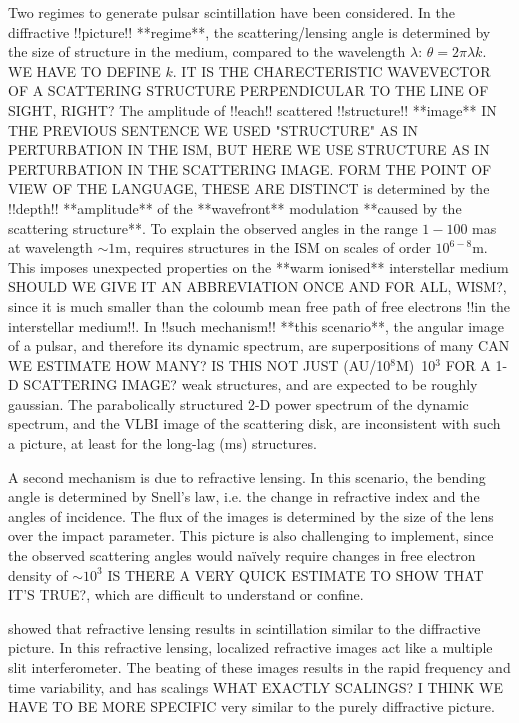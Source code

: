 \documentclass[useAMS,usenatbib]{mn2e}
\begin{document}
Two regimes to generate pulsar scintillation have been considered. In
the diffractive !!picture!! **regime**, the scattering/lensing angle is determined by
the size of structure in the medium, compared to the wavelength
$\lambda$: $\theta=2\pi\lambda k$. WE HAVE TO DEFINE $k$. IT IS THE CHARECTERISTIC WAVEVECTOR 
OF A SCATTERING STRUCTURE PERPENDICULAR TO THE LINE OF SIGHT, RIGHT?  The amplitude of !!each!! scattered
!!structure!! **image** IN THE PREVIOUS SENTENCE WE USED "STRUCTURE" AS IN PERTURBATION IN THE ISM,
BUT HERE WE USE STRUCTURE AS IN PERTURBATION IN THE SCATTERING IMAGE. FORM THE POINT OF VIEW
OF THE LANGUAGE, THESE ARE DISTINCT is determined by the !!depth!! **amplitude** of the **wavefront** modulation **caused by the scattering structure**.  To explain
the observed angles in the range $1-100$ mas at wavelength $\sim 1$m,
requires structures in the ISM on scales of order $10^{6-8}$m. This
imposes unexpected properties on the **warm ionised** interstellar medium SHOULD WE GIVE IT
AN ABBREVIATION ONCE AND FOR ALL, WISM?, since it is
much smaller than the coloumb mean free path of free electrons !!in the
interstellar medium!!.  In !!such mechanism!! **this scenario**, the angular image of a
pulsar, and therefore its dynamic spectrum, are superpositions of many CAN WE ESTIMATE HOW MANY?
IS THIS NOT JUST (AU/10$^8$M)~10$^3$ FOR A 1-D SCATTERING IMAGE?
weak structures, and are expected to be roughly gaussian.  The
parabolically structured 2-D power spectrum of the dynamic spectrum,
and the VLBI image of the scattering disk, are inconsistent with such
a picture, at least for the long-lag (ms) structures.

A second mechanism is due to refractive lensing.  In this scenario,
the bending angle is determined by Snell's law, i.e. the change in
refractive index and the angles of incidence.  The flux of the images
is determined by the size of the lens over the impact parameter.  This
picture is also challenging to implement, since the observed
scattering angles would na\"ively require changes in free electron
density of $\sim 10^3$ IS THERE A VERY QUICK ESTIMATE TO
SHOW THAT IT'S TRUE?, which are difficult to understand or confine.

\cite{2006ApJ...640L.159G} showed that refractive lensing results in
scintillation similar to the diffractive picture.  In this refractive
lensing, localized refractive images act like a multiple slit
interferometer. The beating of these images results in the rapid
frequency and time variability, and has scalings WHAT EXACTLY SCALINGS? I THINK WE
HAVE TO BE MORE SPECIFIC very similar to the
purely diffractive picture. 
\end{document}
